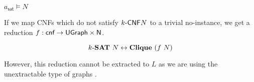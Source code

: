 \begin{lemma}
  $a_\textsf{sat} \models N$
\end{lemma}

If we map CNFs which do not satisfy $\text{$k$-\textsf{CNF}}{N}$ to a trivial no-instance, we get a reduction $f : \textsf{cnf} \rightarrow \textsf{UGraph} \times \mathsf{N}$. 
\begin{theorem}
  \[\text{$k$-\textbf{SAT}{}}~N \leftrightarrow \textbf{Clique}{}~(f~N)\]
\end{theorem}

However, this reduction cannot be extracted to $L$ as we are using the unextractable type of graphs \UGraph. 

